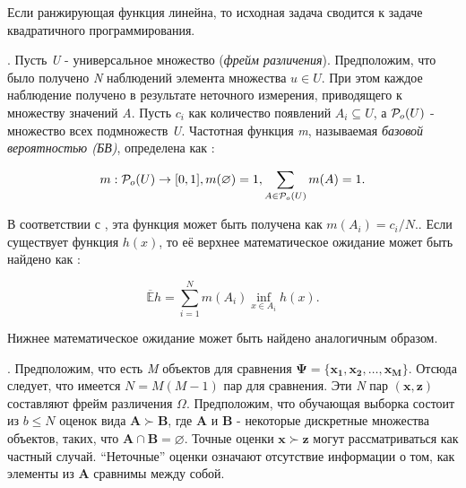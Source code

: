 \documentclass[10pt,a5paper,oneside]{article}
\begin{document}
Если ранжирующая функция линейна, то исходная задача сводится к задаче квадратичного программирования.


\vspace*{1em}

\par
{}. 
Пусть \emph{U} - универсальное множество (\emph{фрейм различения}). 
Предположим, что было получено \emph{N} наблюдений элемента множества \(u \in U\).
При этом каждое наблюдение получено в результате неточного измерения, приводящего к множеству значений \emph{A}.
Пусть \(c_i\) как количество появлений \(A_i \subseteq U\), а \(\mathcal{P}_o(U)\) - множество всех подмножеств \emph{U}.
Частотная функция \emph{m}, называемая \emph{базовой вероятностью (БВ)}, определена как :

\[
m : \mathcal{P}_o(U) \to [0,1], m(\varnothing) = 1, \sum \limits_{A \in \mathcal{P}_o(U)} m(A) = 1.
\]

\par
В соответствии с , эта функция может быть получена как \(m(A_i) = c_i / N.\). 
Если существует функция \(h(x)\), то её верхнее математическое ожидание может быть найдено как :

\[
\mathbb{\overline{E}} h = \sum \limits_{i=1}^N m(A_i) \inf_{x \in A_i} h(x).
\]

\par
Нижнее математическое ожидание может быть найдено аналогичным образом. 


\vspace*{1em}

\par
{}. 
Предположим, что есть \emph{M} объектов для сравнения \(\mathbf{\Psi} = \{\mathbf{x_1}, \mathbf{x_2}, \dots, \mathbf{x_M}\}\). 
Отсюда следует, что имеется \(N = M(M - 1)\) пар для сравнения. 
Эти \emph{N} пар \((\mathbf{x}, \mathbf{z})\) составляют фрейм различения \(\Omega\). 
Предположим, что обучающая выборка состоит из \(b \leq N\) оценок вида \(\mathbf{A} \succ \mathbf{B}\), где \(\mathbf{A}\) и \(\mathbf{B}\) - некоторые дискретные множества объектов, таких, что \(\mathbf{A} \cap \mathbf{B} = \varnothing\).  
Точные оценки \(\mathbf{x} \succ \mathbf{z}\) могут рассматриваться как частный случай. 
``Неточные'' оценки означают отсутствие информации о том, как элементы из \(\mathbf{A}\) сравнимы между собой. 
\end{document}
